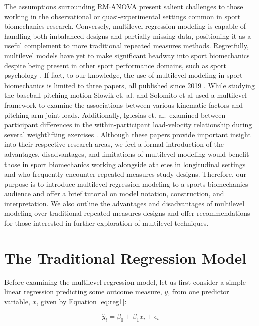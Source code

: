 \documentclass[
]{article}
\begin{document}
The assumptions surrounding RM\(\cdot\)ANOVA present salient challenges to those working in the observational or quasi-experimental settings common in sport biomechanics research. Conversely, multilevel regression modeling is capable of handling both imbalanced designs and partially missing data, positioning it as a useful complement to more traditional repeated measures methods. Regretfully, multilevel models have yet to make significant headway into sport biomechanics despite being present in other sport performance domains, such as sport psychology \cite{beauchamp2005,benson2016,cornelius2007}. If fact, to our knowledge, the use of multilevel modeling in sport biomechanics is limited to three papers, all published since 2019 \cite{slowik2019, iglesias2021, solomito2020}. While studying the baseball pitching motion Slowik et. al.\cite{slowik2019} and Solomito et al \cite{solomito2020} used a multilevel framework to examine the associations between various kinematic factors and pitching arm joint loads. Additionally, Iglesias et. al.~examined between-participant differences in the within-participant load-velocity relationship during several weightlifting exercises \cite{iglesias2021}. Although these papers provide important insight into their respective research areas, we feel a formal introduction of the advantages, disadvantages, and limitations of multilevel modeling would benefit those in sport biomechanics working alongside athletes in longitudinal settings and who frequently encounter repeated measures study designs. Therefore, our purpose is to introduce multilevel regression modeling to a sports biomechanics audience and offer a brief tutorial on model notation, construction, and interpretation. We also outline the advantages and disadvantages of multilevel modeling over traditional repeated measures designs and offer recommendations for those interested in further exploration of multilevel techniques.

\hypertarget{the-traditional-regression-model}{%
\section{The Traditional Regression Model}\label{the-traditional-regression-model}}

Before examining the multilevel regression model, let us first consider a simple linear regression predicting some outcome measure, \(y\), from one predictor variable, \(x\), given by Equation \ref{eq:reg1}:

\begin{equation}
\hat{y}_{i}=\beta_{0}+\beta_{1}x_{i}+\epsilon_{i}
\label{eq:reg1}
\end{equation}
\end{document}
